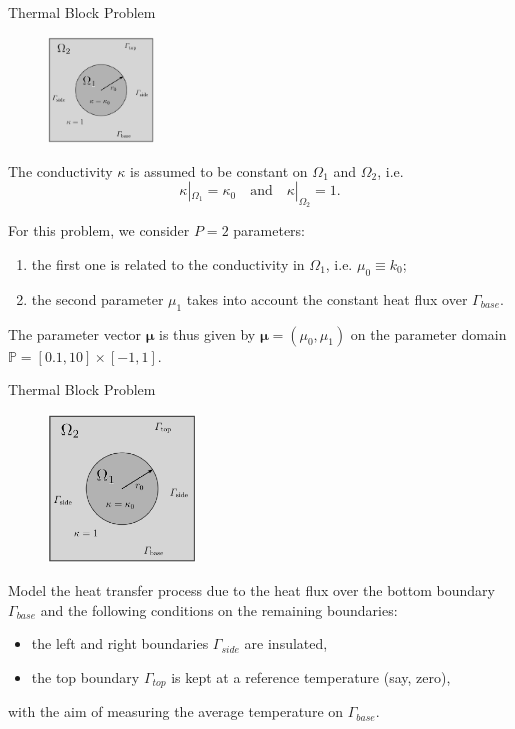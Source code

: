 \documentclass[9pt]{beamer}
\begin{document}
\begin{frame}{Thermal Block Problem}
\begin{figure}
        \centering
        \includegraphics[width=0.25\textwidth]{thermal_block.png}
    \end{figure}
\begin{block}{}
    The conductivity $\kappa$ is assumed to be constant on $\Omega_1$ and $\Omega_2$, i.e.
$$
\kappa|_{\Omega_1}=\kappa_0 \quad \textrm{and} \quad \kappa|_{\Omega_2}=1.
$$
\end{block}

\begin{block}{}
  For this problem, we consider $P=2$ parameters:
\begin{enumerate}
\item the first one is related to the conductivity in $\Omega_1$, i.e. $\mu_0\equiv k_0$;
\item the second parameter $\mu_1$ takes into account the constant heat flux over $\Gamma_{base}$.
\end{enumerate}

The parameter vector $\boldsymbol{\mu}$ is thus given by 
$
\boldsymbol{\mu} = (\mu_0,\mu_1)
$
on the parameter domain
$
\mathbb{P}=[0.1,10]\times[-1,1].
$
\end{block}
\end{frame}

\begin{frame}{Thermal Block Problem}
\begin{block}{}
    \begin{figure}
        \centering
        \includegraphics[width=0.35\textwidth]{thermal_block.png}
    \end{figure}
Model the heat transfer process due to the heat flux over the bottom boundary $\Gamma_{base}$ and the following conditions on the remaining boundaries:
\begin{itemize}
    \item the left and right boundaries $\Gamma_{side}$ are insulated,
    \item the top boundary $\Gamma_{top}$ is kept at a reference temperature (say, zero),
\end{itemize}
with the aim of measuring the average temperature on $\Gamma_{base}$.
\end{block}
\end{frame}
\end{document}
